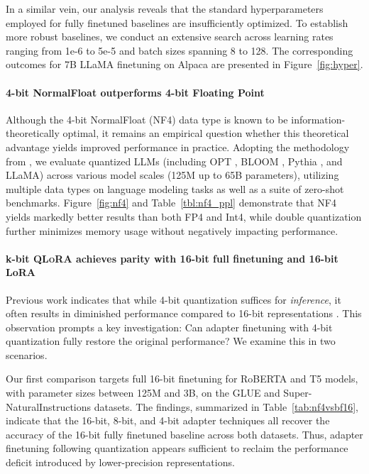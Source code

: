 In a similar vein, our analysis reveals that the standard hyperparameters employed for fully finetuned baselines are insufficiently optimized. To establish more robust baselines, we conduct an extensive search across learning rates ranging from 1e-6 to 5e-5 and batch sizes spanning 8 to 128. The corresponding outcomes for 7B LLaMA finetuning on Alpaca are presented in Figure~\ref{fig:hyper}.

\paragraph{4-bit NormalFloat outperforms 4-bit Floating Point}

Although the 4-bit NormalFloat (NF4) data type is known to be information-theoretically optimal, it remains an empirical question whether this theoretical advantage yields improved performance in practice. Adopting the methodology from \citet{dettmers2022case}, we evaluate quantized LLMs (including OPT \citep{zhang2022opt}, BLOOM \cite{scao2022bloom}, Pythia \cite{biderman2023pythia}, and LLaMA) across various model scales (125M up to 65B parameters), utilizing multiple data types on language modeling tasks as well as a suite of zero-shot benchmarks. Figure~\ref{fig:nf4} and Table~\ref{tbl:nf4_ppl} demonstrate that NF4 yields markedly better results than both FP4 and Int4, while double quantization further minimizes memory usage without negatively impacting performance.

\paragraph{k-bit \textsc{QLoRA} achieves parity with 16-bit full finetuning and 16-bit LoRA}

Previous work indicates that while 4-bit quantization suffices for \emph{inference}, it often results in diminished performance compared to 16-bit representations \citep{dettmers2022case,frantar2022gptq}. This observation prompts a key investigation: Can adapter finetuning with 4-bit quantization fully restore the original performance? We examine this in two scenarios.

Our first comparison targets full 16-bit finetuning for RoBERTA and T5 models, with parameter sizes between 125M and 3B, on the GLUE and Super-NaturalInstructions datasets. The findings, summarized in Table~\ref{tab:nf4vsbf16}, indicate that the 16-bit, 8-bit, and 4-bit adapter techniques all recover the accuracy of the 16-bit fully finetuned baseline across both datasets. Thus, adapter finetuning following quantization appears sufficient to reclaim the performance deficit introduced by lower-precision representations.

